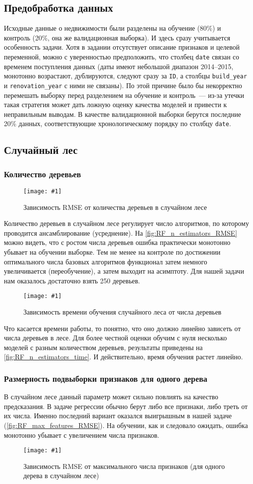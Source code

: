 \documentclass[12pt]{article}
\newcommand{\mpl}[2]{
    \begin{figure}[!h]
        \texttt{[image: \#1]}
        \centering
        \caption{#2}
        \label{fig:#1}
     \end{figure}
}
\begin{document}
\subsection{Предобработка данных}
Исходные данные о недвижимости были разделены на обучение (80\%) и контроль (20\%, она же валидационная выборка). И здесь сразу учитывается особенность задачи. Хотя в задании отсутствует описание признаков и целевой переменной, можно с уверенностью предположить, что столбец \verb|date| связан со временем поступления данных (даты имеют небольшой диапазон 2014--2015, монотонно возрастают, дублируются, следуют сразу за \verb|ID|, а столбцы \verb|build_year| и \verb|renovation_year| с ними не связаны). По этой причине было бы некорректно перемешать выборку перед разделением на обучение и контроль~--- из-за утечки такая стратегия может дать ложную оценку качества моделей и привести к неправильным выводам. В качестве валидационной выборки берутся последние 20\% данных, соответствующие хронологическому порядку по столбцу \verb|date|.

\subsection{Случайный лес}
\subsubsection{Количество деревьев}
\mpl{RF_n_estimators_RMSE}{Зависимость RMSE от количества деревьев в случайном лесе}
Количество деревьев в случайном лесе регулирует число алгоритмов, по которому проводится ансамблирование (усреднение). На \autoref{fig:RF_n_estimators_RMSE} можно видеть, что с ростом числа деревьев ошибка практически монотонно убывает на обучении выборке. Тем не менее на контроле по достижении оптимального числа базовых алгоритмов функционал затем немного увеличивается (переобучение), а затем выходит на асимптоту. Для нашей задачи нам оказалось достаточно взять 250 деревьев.
\mpl{RF_n_estimators_time}{Зависимость времени обучения случайного леса от числа деревьев}
Что касается времени работы, то понятно, что оно должно линейно зависеть от числа деревьев в лесе. Для более честной оценки обучим с нуля несколько моделей с разным количеством деревьев, результаты приведены на \autoref{fig:RF_n_estimators_time}. И действительно, время обучения растет линейно.

\subsubsection{Размерность подвыборки признаков для одного дерева}
В случайном лесе данный параметр может сильно повлиять на качество предсказания. В задаче регрессии обычно берут либо все признаки, либо треть от их числа. Именно последний вариант оказался выигрышным в нашей задаче (\autoref{fig:RF_max_features_RMSE}). На обучении, как и следовало ожидать, ошибка монотонно убывает с увеличением числа признаков.
\mpl{RF_max_features_RMSE}{Зависимость RMSE от максимального числа признаков (для одного дерева в случайном лесе)}
\end{document}
